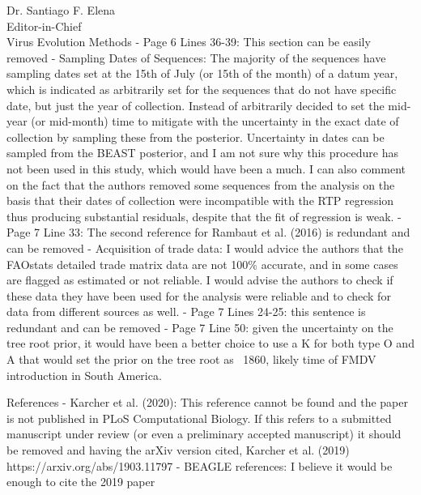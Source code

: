 \documentclass[12pt, a4paper]{letter} %
\begin{document}
\begin{letter}{
	Dr. Santiago F. Elena\\
    Editor-in-Chief \\
    Virus Evolution
}
Methods
-       Page 6 Lines 36-39: This section can be easily removed
-       Sampling Dates of Sequences: The majority of the sequences have sampling dates set at the 15th of July (or 15th of the month) of a datum year, which is indicated as arbitrarily set for the sequences that do not have specific date, but just the year of collection. Instead of arbitrarily decided to set the mid-year (or mid-month) time to mitigate with the uncertainty in the exact date of collection by sampling these from the posterior. Uncertainty in dates can be sampled from the BEAST posterior, and I am not sure why this procedure has not been used in this study, which would have been a much. I can also comment on the fact that the authors removed some sequences from the analysis on the basis that their dates of collection were incompatible with the RTP regression thus producing substantial residuals, despite that the fit of regression is weak.
-       Page 7 Line 33: The second reference for Rambaut et al. (2016) is redundant and can be removed
-       Acquisition of trade data: I would advice the authors that the FAOstats detailed trade matrix data are not 100\% accurate, and in some cases are flagged as estimated or not reliable. I would advise the authors to check if these data they have been used for the analysis were reliable and to check for data from different sources as well.
-       Page 7 Lines 24-25: this sentence is redundant and can be removed
-       Page 7 Line 50: given the uncertainty on the tree root prior, it would have been a better choice to use a K for both type O and A that would set the prior on the tree root as ~1860, likely time of FMDV introduction in South America.

References
-       Karcher et al. (2020): This reference cannot be found and the paper is not published in PLoS Computational Biology. If this refers to a submitted manuscript under review (or even a preliminary accepted manuscript) it should be removed and having the arXiv version cited, Karcher et al. (2019) https://arxiv.org/abs/1903.11797
-       BEAGLE references: I believe it would be enough to cite the 2019 paper


\end{letter}
\end{document}

